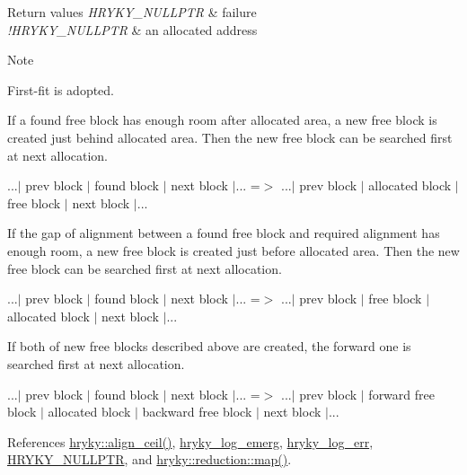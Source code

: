 \begin{DoxyRetVals}{Return values}
{\em H\-R\-Y\-K\-Y\-\_\-\-N\-U\-L\-L\-P\-T\-R} & failure \\
\hline
{\em !\-H\-R\-Y\-K\-Y\-\_\-\-N\-U\-L\-L\-P\-T\-R} & an allocated address\\
\hline
\end{DoxyRetVals}
\begin{DoxyNote}{Note}

\begin{DoxyItemize}
\item First-\/fit is adopted.
\item If a found free block has enough room after allocated area, a new free block is created just behind allocated area. Then the new free block can be searched first at next allocation.

...$|$ prev block $|$ found block $|$ next block $|$... =$>$ ...$|$ prev block $|$ allocated block $|$ free block $|$ next block $|$...
\end{DoxyItemize}
\end{DoxyNote}

\begin{DoxyItemize}
\item If the gap of alignment between a found free block and required alignment has enough room, a new free block is created just before allocated area. Then the new free block can be searched first at next allocation.

...$|$ prev block $|$ found block $|$ next block $|$... =$>$ ...$|$ prev block $|$ free block $|$ allocated block $|$ next block $|$...
\end{DoxyItemize}


\begin{DoxyItemize}
\item If both of new free blocks described above are created, the forward one is searched first at next allocation.

...$|$ prev block $|$ found block $|$ next block $|$... =$>$ ...$|$ prev block $|$ forward free block $|$ allocated block $|$ backward free block $|$ next block $|$... 
\end{DoxyItemize}

References \hyperlink{namespacehryky_a7ddd0f39f2f0953fe7e3cbaedaf98644}{hryky\-::align\-\_\-ceil()}, \hyperlink{log__writer__common_8h_a8d142be5e91677a27be199c3f4115ba6}{hryky\-\_\-log\-\_\-emerg}, \hyperlink{log__writer__common_8h_ae5ad3dabb33f594695ef40753cb78aad}{hryky\-\_\-log\-\_\-err}, \hyperlink{common_8h_a4cd4ac09cfcdbd6b30ee69afc156e210}{H\-R\-Y\-K\-Y\-\_\-\-N\-U\-L\-L\-P\-T\-R}, and \hyperlink{namespacehryky_1_1reduction_ac5eae270cf8047b294dc4ff3e5e11a79}{hryky\-::reduction\-::map()}.

